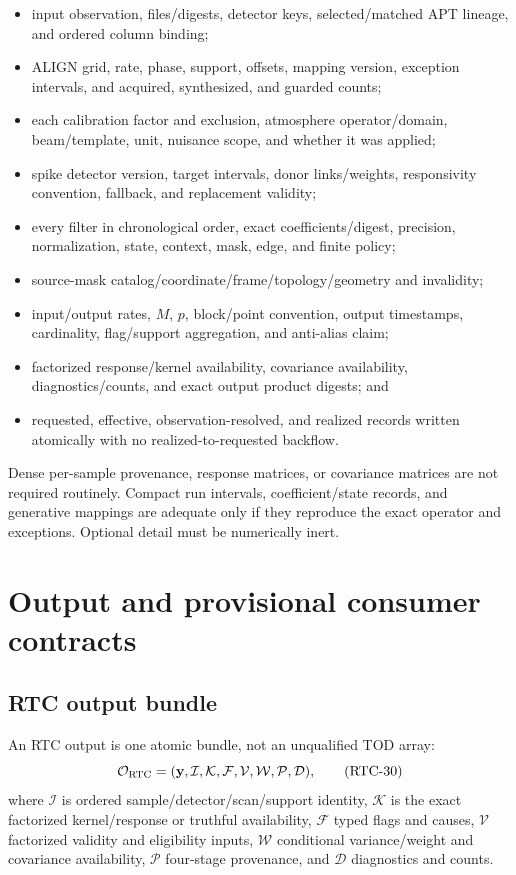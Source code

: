 \documentclass[11pt]{article}
\begin{document}
\begin{itemize}
\item input observation, files/digests, detector keys, selected/matched APT
      lineage, and ordered column binding;
\item ALIGN grid, rate, phase, support, offsets, mapping version, exception
      intervals, and acquired, synthesized, and guarded counts;
\item each calibration factor and exclusion, atmosphere operator/domain,
      beam/template, unit, nuisance scope, and whether it was applied;
\item spike detector version, target intervals, donor links/weights,
      responsivity convention, fallback, and replacement validity;
\item every filter in chronological order, exact coefficients/digest,
      precision, normalization, state, context, mask, edge, and finite policy;
\item source-mask catalog/coordinate/frame/topology/geometry and invalidity;
\item input/output rates, $M$, $p$, block/point convention, output timestamps,
      cardinality, flag/support aggregation, and anti-alias claim;
\item factorized response/kernel availability, covariance availability,
      diagnostics/counts, and exact output product digests; and
\item requested, effective, observation-resolved, and realized records written
      atomically with no realized-to-requested backflow.
\end{itemize}

Dense per-sample provenance, response matrices, or covariance matrices are not
required routinely.  Compact run intervals, coefficient/state records, and
generative mappings are adequate only if they reproduce the exact operator and
exceptions.  Optional detail must be numerically inert.

\section{Output and provisional consumer contracts}

\subsection{RTC output bundle}

An RTC output is one atomic bundle, not an unqualified TOD array:
\begin{equation}
 \mathcal O_{\rm RTC}=
 (\mathbf y,\mathcal I,\mathcal K,\mathcal F,\mathcal V,
  \mathcal W,\mathcal P,\mathcal D),
 \tag{RTC-30}\label{eq:bundle}
\end{equation}
where $\mathcal I$ is ordered sample/detector/scan/support identity,
$\mathcal K$ is the exact factorized kernel/response or truthful availability,
$\mathcal F$ typed flags and causes, $\mathcal V$ factorized validity and
eligibility inputs, $\mathcal W$ conditional variance/weight and covariance
availability, $\mathcal P$ four-stage provenance, and $\mathcal D$ diagnostics
and counts.
\end{document}
